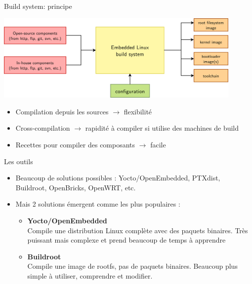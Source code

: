 \begin{frame}{Build system: principe}
  \begin{center}
    \includegraphics[width=0.9\textwidth]{graphics/buildsystem-principle.pdf}
  \end{center}
  \begin{itemize}
  \item Compilation depuis les sources $\rightarrow$ flexibilité
  \item Cross-compilation $\rightarrow$ rapidité à compiler si utilise des machines de build
  \item Recettes pour compiler des composants $\rightarrow$ facile
  \end{itemize}
\end{frame}

\begin{frame}{Les outils}
  \begin{itemize}
  \item Beaucoup de solutions possibles : Yocto/OpenEmbedded, PTXdist,
    Buildroot, OpenBricks, OpenWRT, etc.
  \item Mais 2 solutions émergent comme les plus populaires :
    \begin{itemize}
    \item {\bf Yocto/OpenEmbedded}\\Compile une distribution Linux complète avec des paquets binaires. Très puissant mais complexe et prend beaucoup de temps à apprendre
    \item {\bf Buildroot}\\Compile une image de rootfs, pas de paquets binaires. Beaucoup plus simple à utiliser, comprendre et modifier.
    \end{itemize}
  \end{itemize}
\end{frame}
